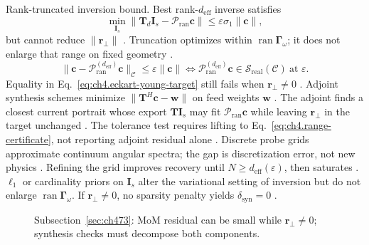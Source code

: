 Rank-truncated inversion bound. Best rank-\(d_{\mathrm{eff}}\) inverse satisfies
\begin{equation}
\label{eq:ch4.rank-truncated-inverse}
\min_{\mathbf{I}_{s}}\|\mathbf{T}_{d}\mathbf{I}_{s}-\mathcal{P}_{\mathrm{ran}}\mathbf{c}\|
\le
\varepsilon\sigma_{1}\|\mathbf{c}\|,
\end{equation}
but cannot reduce \(\|\mathbf{r}_{\perp}\|\) \cite{harrington2001}. Truncation optimizes within $\operatorname{ran}\boldsymbol{\Gamma}_\omega$; it does not enlarge that range on fixed geometry
\cite{devaney2004}.
\begin{equation}
\label{eq:ch4.eckart-young-target}
\|\mathbf{c}-\mathcal{P}_{\mathrm{ran}}^{(d_{\mathrm{eff}})}\mathbf{c}\|_{\mathcal{C}}\le\varepsilon\|\mathbf{c}\|
\iff
\mathcal{P}_{\mathrm{ran}}^{(d_{\mathrm{eff}})}\mathbf{c}\in\mathcal{S}_{\mathrm{real}}(\mathcal{C})\ \text{at }\varepsilon.
\end{equation}
Equality in Eq.~\eqref{eq:ch4.eckart-young-target} still fails when \(\mathbf{r}_{\perp}\neq0\) \cite{harrington2001}.
Adjoint synthesis schemes minimize \(\|\mathbf{T}^{H}\mathbf{c}-\mathbf{w}\|\) on feed weights \(\mathbf{w}\) \cite{harrington2001}. The adjoint
finds a closest current portrait whose export \(\mathbf{T}\mathbf{I}_{s}\) may fit \(\mathcal{P}_{\mathrm{ran}}\mathbf{c}\) while leaving
\(\mathbf{r}_{\perp}\) in the target unchanged \cite{stratton1941}. The tolerance test requires lifting to Eq.~\eqref{eq:ch4.range-certificate},
not reporting adjoint residual alone \cite{harrington2001}.
Discrete probe grids approximate continuum angular spectra; the gap is discretization error, not new physics \cite{stratton1941}. Refining the grid improves recovery until $N\ge d_{\mathrm{eff}}(\varepsilon)$, then saturates \cite{devaney2004}.
\label{lem:ch4.sparsity-obstruction}
\(\ell_{1}\) or cardinality priors on \(\mathbf{I}_{s}\) alter the variational setting of inversion but do not enlarge
\(\operatorname{ran}\boldsymbol{\Gamma}_\omega\). If \(\mathbf{r}_{\perp}\neq0\), no sparsity penalty yields \(\delta_{\mathrm{syn}}=0\)
\cite{harrington2001}.
\begin{figure}[t]
\centering
{}
\caption{Subsection~\ref{sec:ch473}: MoM residual can be small while \(\mathbf{r}_{\perp}\neq0\); synthesis checks must decompose both components.}
\label{fig:ch4.inversion-residual-split}
\end{figure}
